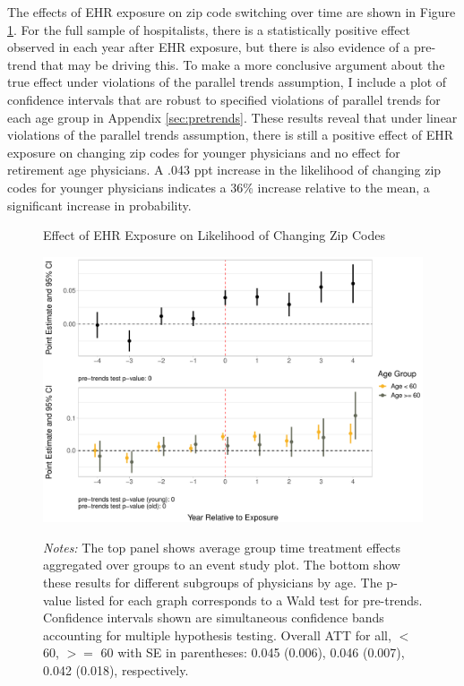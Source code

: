 \documentclass[12pt]{article}
\begin{document}
The effects of EHR exposure on zip code switching over time are shown in Figure \ref{fig:zip}. For the full sample of hospitalists, there is a statistically positive effect observed in each year after EHR exposure, but there is also evidence of a pre-trend that may be driving this. To make a more conclusive argument about the true effect under violations of the parallel trends assumption, I include a plot of confidence intervals that are robust to specified violations of parallel trends for each age group in Appendix \ref{sec:pretrends}. These results reveal that under linear violations of the parallel trends assumption, there is still a positive effect of EHR exposure on changing zip codes for younger physicians and no effect for retirement age physicians. A .043 ppt increase in the likelihood of changing zip codes for younger physicians indicates a 36\% increase relative to the mean, a significant increase in probability. 

\begin{figure}[ht]
    \centering
    \captionsetup{width=.85\linewidth}
    \caption{Effect of EHR Exposure on Likelihood of Changing Zip Codes}
    \includegraphics[scale=.6]{Objects/zip_plot.pdf}
    \label{fig:zip}
    \vspace{2mm}
    \caption*{\footnotesize{\textit{Notes:} The top panel shows average group time treatment effects aggregated over groups to an event study plot. The bottom show these results for different subgroups of physicians by age. The p-value listed for each graph corresponds to a Wald test for pre-trends. Confidence intervals shown are simultaneous confidence bands accounting for multiple hypothesis testing. Overall ATT for all, $<$ 60, $>=$ 60 with SE in parentheses: 0.045 (0.006), 0.046 (0.007), 0.042 (0.018), respectively.}}
\end{figure}
\end{document}
